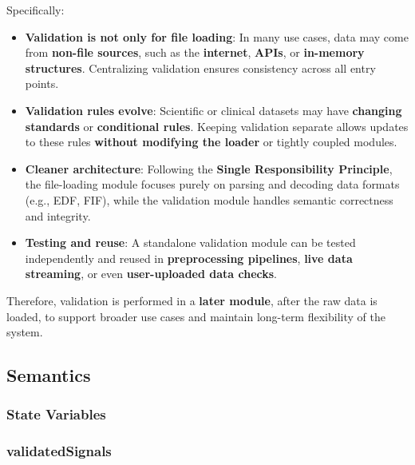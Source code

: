 \documentclass[12pt, titlepage]{article}
\begin{document}
Specifically:


\begin{itemize}
\item
\textbf{Validation is not only for file loading}: In many use cases, data may come from \textbf{non-file sources}, such as the \textbf{internet}, \textbf{APIs}, or \textbf{in-memory structures}. Centralizing validation ensures consistency across all entry points.

\item
\textbf{Validation rules evolve}: Scientific or clinical datasets may have \textbf{changing standards} or \textbf{conditional rules}. Keeping validation separate allows updates to these rules \textbf{without modifying the loader} or tightly coupled modules.

\item
\textbf{Cleaner architecture}: Following the \textbf{Single Responsibility Principle}, the file-loading module focuses purely on parsing and decoding data formats (e.g., EDF, FIF), while the validation module handles semantic correctness and integrity.

\item
\textbf{Testing and reuse}: A standalone validation module can be tested independently and reused in \textbf{preprocessing pipelines}, \textbf{live data streaming}, or even \textbf{user-uploaded data checks}.

\end{itemize}





Therefore, validation is performed in a \textbf{later module}, after the raw data is loaded, to support broader use cases and maintain long-term flexibility of the system.

\subsection{Semantics}

\subsubsection{State Variables}



\subsubsection*{\textbf{validatedSignals}}
\end{document}
